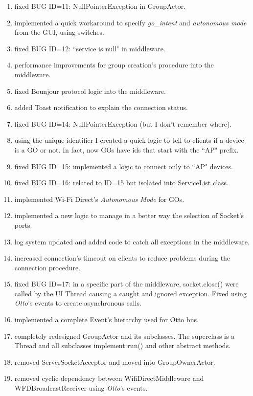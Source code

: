 \begin{enumerate}
	\item fixed BUG ID=11: NullPointerException in \textsf{GroupActor}.
	\item implemented a quick workaround to specify \emph{go\_intent} and \emph{autonomous mode} from the GUI, using switches.
	\item fixed BUG ID=12: ``service is null" in middleware.
	\item performance improvements for group creation's procedure into the middleware.
	\item fixed Bounjour protocol logic into the middleware.
	\item added Toast notification to explain the connection status.
	\item fixed BUG ID=14: NullPointerException (but I don't remember where).
	\item using the unique identifier I created a quick logic to tell to clients if a device is a GO or not. In fact, now GOs have ids that start with the ``AP" prefix.
	\item fixed BUG ID=15: implemented a logic to connect only to ``AP" devices.
	\item fixed BUG ID=16: related to ID=15 but isolated into \textsf{ServiceList} class.
	\item implemented Wi-Fi Direct's \emph{Autonomous Mode} for GOs.
	\item implemented a new logic to manage in a better way the selection of Socket's ports.
	\item log system updated and added code to catch all exceptions in the middleware.
	\item increased connection's timeout on clients to reduce problems during the connection procedure.
	\item fixed BUG ID=17: in a specific part of the middleware, \textsf{socket.close()} were called by the UI Thread causing a caught and ignored exception. Fixed using \emph{Otto}'s events to create asynchronous calls.
	\item implemented a complete Event's hierarchy used for Otto bus.
	\item completely redesigned \textsf{GroupActor} and its subclasses. The superclass is a Thread and all subclasses implement \textsf{run()} and other abstract methods.
	\item removed \textsf{ServerSocketAcceptor} and moved into \textsf{GroupOwnerActor}.
	\item removed cyclic dependency between \textsf{WifiDirectMiddleware} and \textsf{WFDBroadcastReceiver} using \emph{Otto}'s events.

\end{enumerate}
